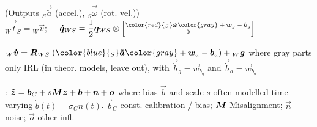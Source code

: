  (Outputs {\color{blue} ${_S}\vec{\tilde{a}}$} (accel.), {\color{red} ${_S}\vec{\tilde{\omega}}$} (rot. vel.))\\
${_W}\vec{\dot{t}}_S = {_W} \vec{v}$;
$\quad \displaystyle \vec{\dot{q}}_{WS} = \frac{1}{2} \vec{q}_{WS} \otimes
    {\scriptsize
        \begin{bmatrix}
            {\color{red}{_S}\vec{\tilde{\omega}}} {\color{gray} + \vec{w}_g - \vec{b}_g} \\
            0
        \end{bmatrix}
    }$

${_W}\vec{\dot{v}} = \mat{R}_{WS}\; ({\color{blue}{_S}\vec{\tilde{a}}} {\color{gray} + \vec{w}_a - \vec{b}_a}) + {_W}\vec{g}$
where {\color{gray} gray parts} only IRL (in theor. models, leave out), with $\vec{\dot{b}}_g = \vec{w}_{b_g}$ and $\vec{\dot{b}}_a = \vec{w}_{b_a}$

: $\bm{\tilde{z}} = \bm{b}_C + s\bm{M}\bm{z} + \bm{b} + \bm{n} + \bm{o}$
where bias $\vec{b}$ and scale $s$ often modelled time-varying $\dot{b}(t) = \sigma_C n(t)$.
$\vec{b}_C$ const. calibration / bias; $\bm{M}$ Misalignment; $\vec{n}$ noise; $\vec{o}$ other infl.
